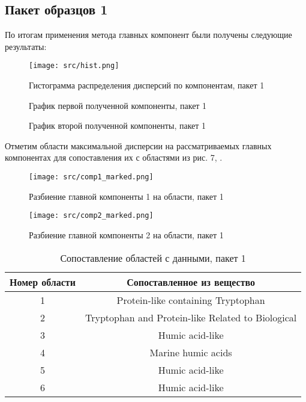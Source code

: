 \documentclass[a4paper]{article}
\begin{document}
\subsection{Пакет образцов 1}
По итогам применения метода главных компонент были получены следующие результаты:
\begin{figure}[H]
    \centering
    \texttt{[image: src/hist.png]}
    \caption{Гистограмма распределения дисперсий по компонентам, пакет 1}
    \label{fig:hist}
\end{figure}
\begin{figure}[H]
    \centering
    
    
    \caption{График первой полученной компоненты, пакет 1}
    \label{fig:comp_1}
\end{figure}
\begin{figure}[H]
    \centering
    
    
    \caption{График второй полученной компоненты, пакет 1}
    \label{fig:comp_2}
\end{figure}
Отметим области максимальной дисперсии на рассматриваемых главных компонентах для сопоставления их с областями из рис. 7, \cite{article1}.
\begin{figure}[H]
    \centering
    \texttt{[image: src/comp1\_marked.png]}
    \caption{Разбиение главной компоненты 1 на области, пакет 1}
    \label{fig:comp1_marked}
\end{figure}
\begin{figure}[H]
    \centering
    \texttt{[image: src/comp2\_marked.png]}
    \caption{Разбиение главной компоненты 2 на области, пакет 1}
    \label{fig:comp2_marked}
\end{figure}
\begin{table}[H]
    \centering
    \begin{tabular}{|c|c|}
        \hline
        Номер области & Сопоставленное из \cite{article1} вещество\\
        \hline  
        1&Protein-like containing Tryptophan\\
        \hline
        2&Tryptophan and Protein-like Related to Biological\\
        \hline
        3&Humic acid-like\\
        \hline
        4&Marine humic acids\\
        \hline
        5&Humic acid-like\\
        \hline
        6&Humic acid-like\\
        \hline
    \end{tabular}
    \caption{Сопоставление областей с данными, пакет 1}
    \label{tab:marked_regions}
\end{table}
\end{document}
